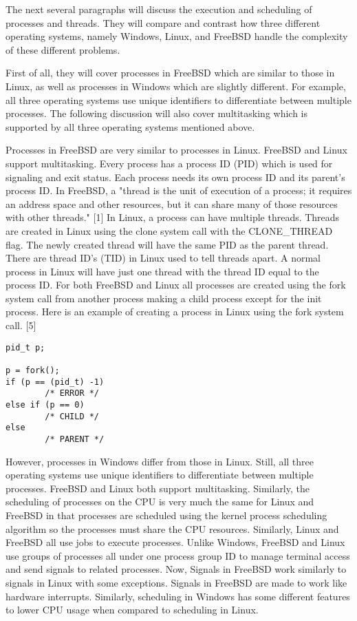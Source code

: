 \documentclass[letterpaper,10pt,onecolumn,draftclsnofoot,]{article}
\begin{document}

The next several paragraphs will discuss the execution and scheduling of processes and threads. They will compare and contrast how three different operating systems, namely Windows, Linux, and FreeBSD handle the complexity of these different problems. 

First of all, they will cover processes in FreeBSD which are similar to those in Linux, as well as processes in Windows which are slightly different. For example, all three operating systems use unique identifiers to differentiate between multiple processes. The following discussion will also cover multitasking which is supported by all three operating systems mentioned above.

Processes in FreeBSD are very similar to processes in Linux. FreeBSD and Linux support multitasking. Every process has a process ID (PID) which is used for signaling and exit status. Each process needs its own process ID and its parent's process ID. In FreeBSD, a "thread is the unit of execution of a process; it requires an address space and other resources, but it can share many of those resources with other threads." [1] In Linux, a process can have multiple threads. Threads are created in Linux using the clone system call with the CLONE\_THREAD flag. The newly created thread will have the same PID as the parent thread. There are thread ID's (TID) in Linux used to tell threads apart. A normal process in Linux will have just one thread with the thread ID equal to the process ID. For both FreeBSD and Linux all processes are created using the fork system call from another process making a child process except for the init process. Here is an example of creating a process in Linux using the fork system call. [5] 
\begin{lstlisting}
pid_t p;

p = fork();
if (p == (pid_t) -1)
        /* ERROR */
else if (p == 0)
        /* CHILD */
else
        /* PARENT */
\end{lstlisting}

However, processes in Windows differ from those in Linux. Still, all three operating systems use unique identifiers to differentiate between multiple processes. FreeBSD and Linux both support multitasking. Similarly, the scheduling of processes on the CPU is very much the same for Linux and FreeBSD in that processes are scheduled using the kernel process scheduling algorithm so the processes must share the CPU resources. Similarly, Linux and FreeBSD all use jobs to execute processes. Unlike Windows, FreeBSD and Linux use groups of processes all under one process group ID to manage terminal access and send signals to related processes. Now, Signals in FreeBSD work similarly to signals in Linux with some exceptions. Signals in FreeBSD are made to work like hardware interrupts. Similarly, scheduling in Windows has some different features to lower CPU usage when compared to scheduling in Linux.
\end{document}

